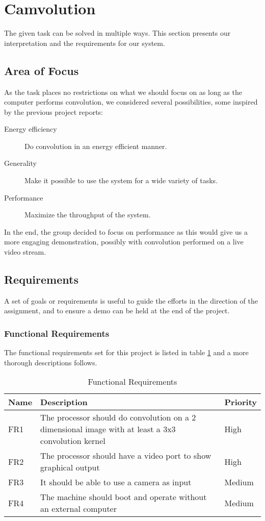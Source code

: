 \section{Camvolution}

The given task can be solved in multiple ways. This section presents our interpretation and the requirements for our system.

\subsection{Area of Focus}
As the task places no restrictions on what we should focus on as long as the computer performs convolution, we considered several possibilities, some inspired by the previous project reports:

\begin{description}
    \item[Energy efficiency] Do convolution in an energy efficient manner.
    \item[Generality] Make it possible to use the system for a wide variety of tasks.
    \item[Performance] Maximize the throughput of the system.
\end{description}

In the end, the group decided to focus on performance as this would give us a more engaging demonstration, possibly with convolution performed on a live video stream.

\subsection{Requirements}
A set of goals or requirements is useful to guide the efforts in the direction of the assignment, and to ensure a demo can be held at the end of the project.

\subsubsection{Functional Requirements}
The functional requirements set for this project is listed in table \ref{tab:FunctionalRequirements} and a more thorough descriptions follows.

\begin{table}[h]
    \centering
    \begin{tabular}{lp{12cm}l}
        Name & Description & Priority \\
        \hline
        FR1 &
            The processor should do convolution on a 2 dimensional image with at least a 3x3 convolution kernel &
            High \\
        FR2 &
            The processor should have a video port to show graphical output &
            High \\
        FR3 &
            It should be able to use a camera as input &
            Medium \\
        FR4 &
            The machine should boot and operate without an external computer &
            Medium
    \end{tabular}
    \caption{Functional Requirements}
    \label{tab:FunctionalRequirements}
\end{table}

